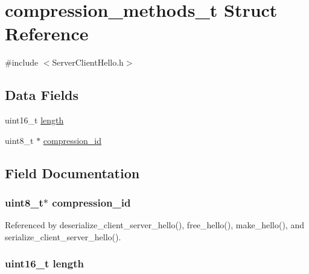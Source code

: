 \hypertarget{structcompression__methods__t}{}\section{compression\+\_\+methods\+\_\+t Struct Reference}
\label{structcompression__methods__t}


{\ttfamily \#include $<$Server\+Client\+Hello.\+h$>$}

\subsection*{Data Fields}
\begin{DoxyCompactItemize}
\item 
uint16\+\_\+t \hyperlink{structcompression__methods__t_a1892eba2086d12ac2b09005aeb09ea3b}{length}
\item 
uint8\+\_\+t $\ast$ \hyperlink{structcompression__methods__t_a2c3e9fd1dd8d353e427fce404df23633}{compression\+\_\+id}
\end{DoxyCompactItemize}


\subsection{Field Documentation}
\subsubsection[{\texorpdfstring{compression\+\_\+id}{compression_id}}]{\setlength{\rightskip}{0pt plus 5cm}uint8\+\_\+t$\ast$ compression\+\_\+id}\hypertarget{structcompression__methods__t_a2c3e9fd1dd8d353e427fce404df23633}{}\label{structcompression__methods__t_a2c3e9fd1dd8d353e427fce404df23633}


Referenced by deserialize\+\_\+client\+\_\+server\+\_\+hello(), free\+\_\+hello(), make\+\_\+hello(), and serialize\+\_\+client\+\_\+server\+\_\+hello().

\subsubsection[{\texorpdfstring{length}{length}}]{\setlength{\rightskip}{0pt plus 5cm}uint16\+\_\+t length}\hypertarget{structcompression__methods__t_a1892eba2086d12ac2b09005aeb09ea3b}{}\label{structcompression__methods__t_a1892eba2086d12ac2b09005aeb09ea3b}


